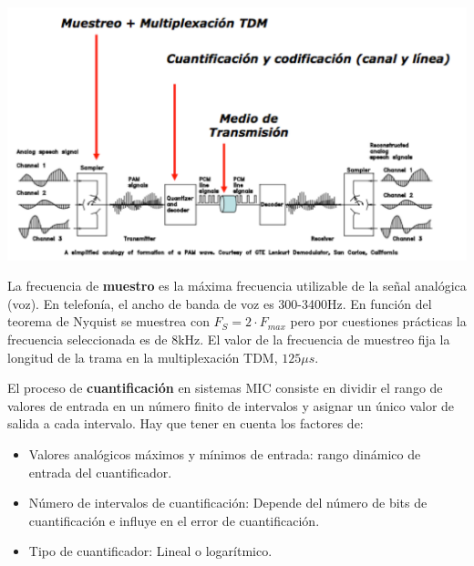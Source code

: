 \documentclass[10pt,portrait, twocolumn]{article}
\makeatletter
\renewcommand{\subsubsection}{\@startsection{subsubsection}{3}{0mm}%
                                {-1ex plus -.5ex minus -.2ex}%
                                {1ex plus .2ex}%
                                {\normalfont\small\bfseries}}
\makeatother
\begin{document}
	\begin{center}
		\includegraphics[scale=0.45]{images/SistemasMIC}
	\end{center}	
	

La frecuencia de \textbf{muestro} es la máxima frecuencia utilizable de la señal analógica (voz). En telefonía, el ancho de banda de voz es 300-3400Hz. En función del teorema de Nyquist se muestrea con $F_{S} = 2 \cdot F_{max}$ pero por cuestiones prácticas la frecuencia seleccionada es de 8kHz. El valor de la frecuencia de muestreo fija la longitud de la trama en la multiplexación TDM, $125\mu s$.


El proceso de \textbf{cuantificación} en sistemas MIC consiste en dividir el rango de valores de entrada en un número finito de intervalos y asignar un único valor de salida a cada intervalo. Hay que tener en cuenta los factores de:

	\begin{itemize}
		\item Valores analógicos máximos y mínimos de entrada: rango dinámico de entrada del cuantificador.
		\item Número de intervalos de cuantificación: Depende del número de bits de cuantificación e influye en el error de cuantificación.
		\item Tipo de cuantificador: Lineal o logarítmico.
	\end{itemize}
\end{document}
